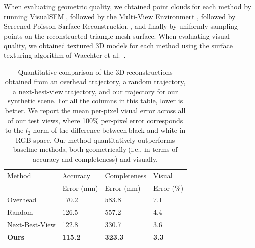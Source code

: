 When evaluating geometric quality, we obtained point clouds for each method by running VisualSFM \cite{wu:2013,wu:2007,wu:2011b,wu:2011a}, followed by the Multi-View Environment \cite{fuhrmann:2015}, followed by Screened Poisson Surface Reconstruction \cite{kazhdan:2013}, and finally by uniformly sampling points on the reconstructed triangle mesh surface.
When evaluating visual quality, we obtained textured 3D models for each method using the surface texturing algorithm of Waechter et al.~\cite{waechter:2014}.

\begin{table}[t]
\centering
\footnotesize
\begin{tabular}{@{}llll@{}}
\toprule
Method         & Accuracy       & Completeness   & Visual     \\
               & Error (mm)     & Error (mm)     & Error (\%) \\
\midrule
Overhead       & 170.2          & 583.8          & 7.1  \\
Random         & 126.5          & 557.2          & 4.4 \\
Next-Best-View & 122.8          & 330.7          & 3.6 \\
\textbf{Ours}  & \textbf{115.2} & \textbf{323.3} & \textbf{3.3} \\
\bottomrule
\end{tabular}
\normalsize
\vspace{5pt}
\caption{
Quantitative comparison of the 3D reconstructions obtained from an overhead trajectory, a random trajectory, a next-best-view trajectory, and our trajectory for our synthetic scene.
For all the columns in this table, lower is better.
We report the mean per-pixel visual error across all of our test views, where 100\% per-pixel error corresponds to the $l_2$ norm of the difference between black and white in RGB space.
Our method quantitatively outperforms baseline methods, both geometrically (i.e., in terms of accuracy and completeness) and visually.
\vspace{-13pt}
}
\label{tbl:quantitative}
\end{table}

